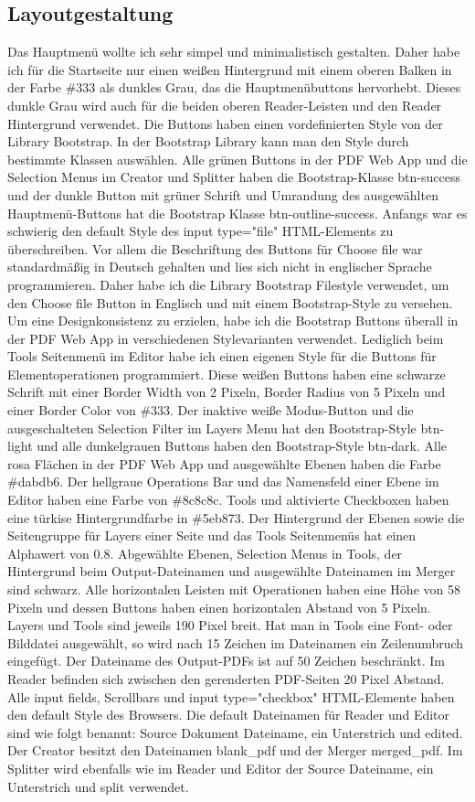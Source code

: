 \subsection{Layoutgestaltung}
Das Hauptmenü wollte ich sehr simpel und minimalistisch gestalten. Daher habe ich für die Startseite nur einen weißen Hintergrund mit einem oberen Balken in der Farbe \#333 als dunkles Grau, das die Hauptmenübuttons hervorhebt. Dieses dunkle Grau wird auch für die beiden oberen Reader-Leisten und den Reader Hintergrund verwendet. Die Buttons haben einen vordefinierten Style von der Library Bootstrap. In der Bootstrap Library kann man den Style durch bestimmte Klassen auswählen. Alle grünen Buttons in der PDF Web App und die Selection Menus im Creator und Splitter haben die Bootstrap-Klasse btn-success und der dunkle Button mit grüner Schrift und Umrandung des ausgewählten Hauptmenü-Buttons hat die Bootstrap Klasse btn-outline-success. Anfangs war es schwierig den default Style des input type="file" HTML-Elements zu überschreiben. Vor allem die Beschriftung des Buttons für Choose file war standardmäßig in Deutsch gehalten und lies sich nicht in englischer Sprache programmieren. Daher habe ich die Library Bootstrap Filestyle verwendet, um den Choose file Button in Englisch und mit einem Bootstrap-Style zu versehen. Um eine Designkonsistenz zu erzielen, habe ich die Bootstrap Buttons überall in der PDF Web App in verschiedenen Stylevarianten verwendet. Lediglich beim Tools Seitenmenü im Editor habe ich einen eigenen Style für die Buttons für Elementoperationen programmiert. Diese weißen Buttons haben eine schwarze Schrift mit einer Border Width von 2 Pixeln, Border Radius von 5 Pixeln und einer Border Color von \#333. Der inaktive weiße Modus-Button und die ausgeschalteten Selection Filter im Layers Menu hat den Bootstrap-Style btn-light und alle dunkelgrauen Buttons haben den Bootstrap-Style btn-dark. Alle rosa Flächen in der PDF Web App und ausgewählte Ebenen haben die Farbe \#dabdb6. Der hellgraue Operations Bar und das Namensfeld einer Ebene im Editor haben eine Farbe von \#8c8c8c. Tools und aktivierte Checkboxen haben eine türkise Hintergrundfarbe in \#5eb873. Der Hintergrund der Ebenen sowie die Seitengruppe für Layers einer Seite und das Tools Seitenmenüs hat einen Alphawert von 0.8. Abgewählte Ebenen, Selection Menus in Tools, der Hintergrund beim Output-Dateinamen und ausgewählte Dateinamen im Merger sind schwarz. Alle horizontalen Leisten mit Operationen haben eine Höhe von 58 Pixeln und dessen Buttons haben einen horizontalen Abstand von 5 Pixeln. Layers und Tools sind jeweils 190 Pixel breit. Hat man in Tools eine Font- oder Bilddatei ausgewählt, so wird nach 15 Zeichen im Dateinamen ein Zeilenumbruch eingefügt. Der Dateiname des Output-PDFs ist auf 50 Zeichen beschränkt. Im Reader befinden sich zwischen den gerenderten PDF-Seiten 20 Pixel Abstand. Alle input fields, Scrollbars und input type="checkbox" HTML-Elemente haben den default Style des Browsers. Die default Dateinamen für Reader und Editor sind wie folgt benannt: Source Dokument Dateiname, ein Unterstrich und edited. Der Creator besitzt den Dateinamen blank\_pdf und der Merger merged\_pdf. Im Splitter wird ebenfalls wie im Reader und Editor der Source Dateiname, ein Unterstrich und split verwendet. 

